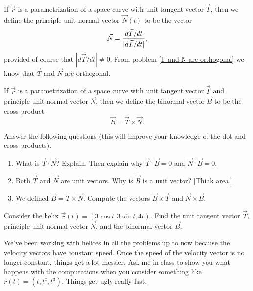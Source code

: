 \begin{definition}
 If $\vec r$ is a parametrization of a space curve with unit tangent vector $\vec T$, then we define the principle unit normal vector $\vec N(t)$ to be the vector
 $$\vec N = \displaystyle\frac{d\vec T/dt}{|d\vec T/dt|},$$
 provided of course that $|d\vec T/dt|\neq 0$. 
 From problem \ref{T and N are orthogonal} we know that $\vec T$ and $\vec N$ are orthogonal.
\end{definition}

\begin{definition}
 If $\vec r$ is a parametrization of a space curve with unit tangent vector $\vec T$ and principle unit normal vector $\vec N$, then we define the binormal vector $\vec B$ to be the cross product
$$\vec B = \vec T\times \vec N.$$
\end{definition}

\begin{problem}
Answer the following questions (this will improve your knowledge of the dot and cross products).
\begin{enumerate}
 \item What is $\vec T\cdot \vec N$? Explain. Then explain why $\vec T\cdot \vec B=0$ and $\vec N\cdot \vec B=0$.
 \item Both $\vec T$ and $\vec N$ are unit vectors. Why is $\vec B$ is a unit vector? [Think area.] 
 \item We defined $\vec B=\vec T\times \vec N$. Compute the vectors $\vec B\times \vec T$ and $\vec N\times \vec B$.
\end{enumerate}
\end{problem}

\begin{problem} \label{helix example of T N and B}
%
Consider the helix $\vec r(t) = (3\cos t,3\sin t, 4t)$.  Find the unit tangent vector $\vec T$, principle unit normal vector $\vec N$, and the binormal vector $\vec B$.  
\end{problem}

We've been working with helices in all the problems up to now because the velocity vectors have constant speed.  Once the speed of the velocity vector is no longer constant, things get a lot messier. Ask me in class to show you what happens with the computations when you consider something like $r(t)=(t,t^2,t^3)$. Things get ugly really fast. 

